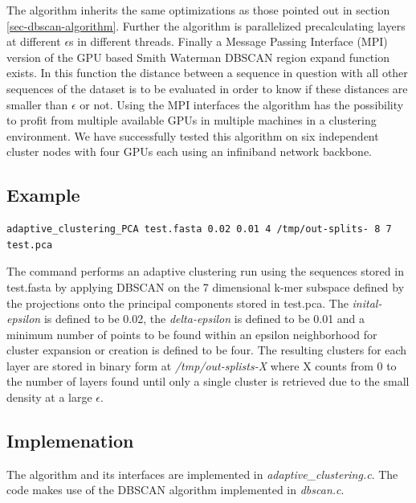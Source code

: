The algorithm inherits the same optimizations as those pointed out
in section \ref{sec-dbscan-algorithm}. Further the algorithm is
parallelized precalculating layers at different $\epsilon$s in
different threads.
Finally a Message Passing Interface (MPI) version of the GPU based
Smith Waterman DBSCAN region expand function exists. In this function
the distance between a sequence in question with all other sequences
of the dataset is to be evaluated in order to know if these
distances are smaller than $\epsilon$ or not.
Using the MPI interfaces the algorithm has the
possibility to profit from multiple available GPUs in multiple
machines in a clustering environment. We have successfully
tested this algorithm on six independent cluster nodes with
four GPUs each using an infiniband network backbone.

\subsection{Example}

\begin{lstlisting}
adaptive_clustering_PCA test.fasta 0.02 0.01 4 /tmp/out-splits- 8 7 test.pca 
\end{lstlisting}
The command performs an adaptive clustering run using the sequences stored in
test.fasta by applying DBSCAN on the 7 dimensional k-mer subspace
defined by the projections onto the principal components stored in
test.pca. The \emph{inital-epsilon} is defined to be 0.02, the
\emph{delta-epsilon} is defined to be 0.01 and a minimum number of
points to be found within an epsilon neighborhood for cluster expansion or creation is defined to be four.
The resulting clusters for each layer are stored in binary form at
\emph{/tmp/out-splists-X} where X counts from 0 to the number of
layers found until only a single cluster is retrieved due to the
small density at a large $\epsilon$.

\subsection{Implemenation}
The algorithm and its interfaces are implemented in
\emph{adaptive\_clustering.c}. The code makes use of the DBSCAN
algorithm implemented in \emph{dbscan.c}. 
